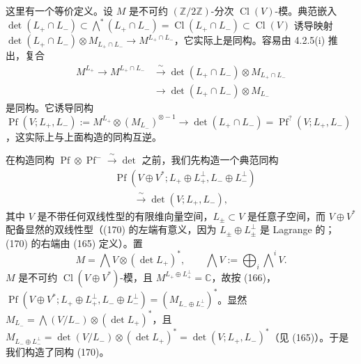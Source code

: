 这里有一个等价定义。设 $M$ 是不可约 $(\mathbb{Z}/2\mathbb{Z})$-分次 $\operatorname{Cl}(V)$-模。典范嵌入 $\det(L_{+}\cap L_{-})\subset\bigwedge^{*}(L_{+}\cap L_{-})=\operatorname{Cl}(L_{+}\cap L_{-})\subset\operatorname{Cl}(V)$ 诱导映射 $\det(L_{+}\cap L_{-})\otimes M_{L_{+}\cap L_{-}}\to M^{L_{+}\cap L_{-}}$，它实际上是同构。容易由 4.2.5(i) 推出，复合
\[
\begin{aligned}
M^{L_{+}}\longrightarrow M^{L_{+}\cap L_{-}}&\xrightarrow{\ \sim\ }\det(L_{+}\cap L_{-})\otimes M_{L_{+}\cap L_{-}}\\
&\longrightarrow\det(L_{+}\cap L_{-})\otimes M_{L_{-}}
\end{aligned}
\]
是同构。它诱导同构 $\operatorname{Pf}(V;L_{+},L_{-}):=M^{L_{+}}\otimes(M_{L_{-}})^{\otimes-1}\to\det(L_{+}\cap L_{-})=\operatorname{Pf}^{?}(V;L_{+},L_{-})$，这实际上与上面构造的同构互逆。

 在构造同构 $\operatorname{Pf}\otimes\operatorname{Pf}^{-}\xrightarrow{\ \sim\ }\det$ 之前，我们先构造一个典范同构
\begin{equation}\tag{170}
\begin{aligned}
&\operatorname{Pf}(V\oplus V^{*};L_{+}\oplus L_{+}^{\perp},L_{-}\oplus L_{-}^{\perp})\\
&\qquad\xrightarrow{\ \sim\ }\det(V;L_{+},L_{-}),
\end{aligned}
\end{equation}
其中 $V$ 是不带任何双线性型的有限维向量空间，$L_{\pm}\subset V$ 是任意子空间，而 $V\oplus V^{*}$ 配备显然的双线性型（(170) 的左端有意义，因为 $L_{\pm}\oplus L_{\pm}^{\perp}$ 是 Lagrange 的；(170) 的右端由 (165) 定义）。置
\begin{equation}\tag{171}
M=\bigwedge V\otimes(\det L_{+})^{*},\qquad \bigwedge V:=\bigoplus_{i}\bigwedge\nolimits^{i}V.
\end{equation}
$M$ 是不可约 $\operatorname{Cl}(V\oplus V^{*})$-模，且 $M^{L_{+}\oplus L_{+}^{\perp}}=\mathbb{C}$，故按 (166)，$\operatorname{Pf}(V\oplus V^{*};L_{+}\oplus L_{+}^{\perp},L_{-}\oplus L_{-}^{\perp})=(M_{L_{-}\oplus L_{-}^{\perp}})^{*}$。显然 $M_{L_{-}}=\bigwedge(V/L_{-})\otimes(\det L_{+})^{*}$，且 $M_{L_{-}\oplus L_{-}^{\perp}}=\det(V/L_{-})\otimes(\det L_{+})^{*}=\det(V;L_{+},L_{-})^{*}$（见 (165)）。于是我们构造了同构 (170)。

